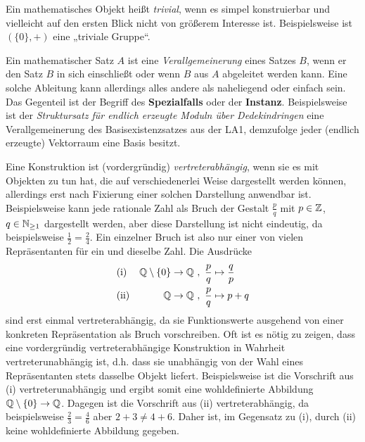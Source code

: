 \begin{description}[labelindent=0pt, leftmargin=0pt]
    Ein mathematisches Objekt heißt \emph{trivial}, wenn es simpel konstruierbar und vielleicht auf den ersten Blick nicht von größerem Interesse ist. Beispielsweise ist $(\{0\},+)$ eine „triviale Gruppe“.

    \item[Verallgemeinerung:] Ein mathematischer Satz $A$ ist eine \emph{Verallgemeinerung} eines Satzes $B$, wenn er den Satz $B$ in sich einschließt oder wenn $B$ aus $A$ abgeleitet werden kann. Eine solche Ableitung kann allerdings alles andere als naheliegend oder einfach sein. Das Gegenteil ist der Begriff des \textbf{Spezialfalls} oder der \textbf{Instanz}. Beispielsweise ist der \emph{Struktursatz für endlich erzeugte Moduln über Dedekindringen} eine Verallgemeinerung des Basisexistenzsatzes aus der LA1, demzufolge jeder (endlich erzeugte) Vektorraum eine Basis besitzt.
    
    \item[Vertreterabhängig:]  Eine Konstruktion ist (vordergründig) \emph{vertreterabhängig}, wenn sie es mit Objekten zu tun hat, die auf verschiedenerlei Weise dargestellt werden können, allerdings erst nach Fixierung einer solchen Darstellung anwendbar ist. Beispielsweise kann jede rationale Zahl als Bruch der Gestalt $\frac{p}{q}$ mit $p\in \mathbb Z$, $q\in \mathbb N_{\ge 1}$ dargestellt werden, aber diese Darstellung ist nicht eindeutig, da beispielsweise $\frac{1}{2}=\frac{2}{4}$. Ein einzelner Bruch ist also nur einer von vielen Repräsentanten für ein und dieselbe Zahl. Die Ausdrücke
    \begin{align*}
        &\text{(i)} & \Q\setminus \{0\} \to \Q \ & ,\ \frac{p}{q} \mapsto \frac{q}{p} \\
        &\text{(ii)} & \Q \to \Q \ & ,\ \frac{p}{q} \mapsto p+q
    \end{align*}
    sind erst einmal vertreterabhängig, da sie Funktionswerte ausgehend von einer konkreten Repräsentation als Bruch vorschreiben. Oft ist es nötig zu zeigen, dass eine vordergründig vertreterabhängige Konstruktion in Wahrheit vertreterunabhängig ist, d.h. dass sie unabhängig von der Wahl eines Repräsentanten stets dasselbe Objekt liefert. Beispielsweise ist die Vorschrift aus (i) vertreterunabhängig und ergibt somit eine wohldefinierte Abbildung $\mathbb Q\setminus \{0\}\to \mathbb Q$. Dagegen ist die Vorschrift aus (ii) vertreterabhängig, da beispielsweise $\frac{2}{3}=\frac{4}{6}$ aber $2+3\neq 4+6$. Daher ist, im Gegensatz zu (i), durch (ii) keine wohldefinierte Abbildung gegeben.
    

\end{description}

